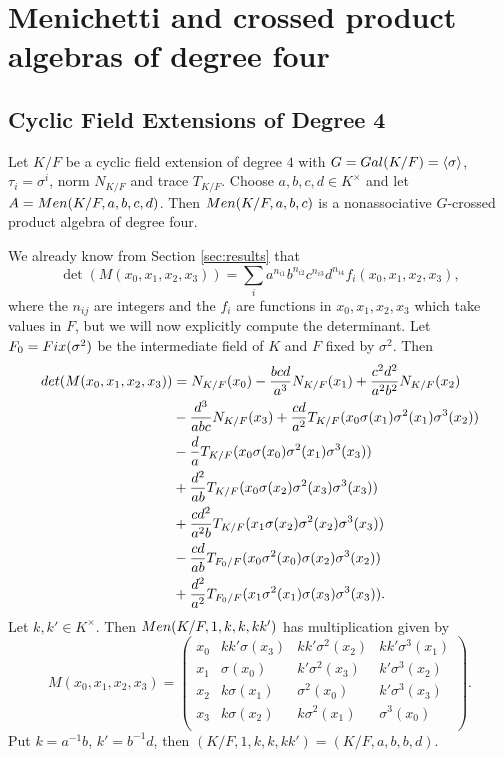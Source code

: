 \documentclass[11pt]{amsart}
\theoremstyle{plain}
\theoremstyle{definition}
\begin{document}
\section{Menichetti and crossed product  algebras of degree four} \label{sec:4}

\subsection{Cyclic Field Extensions of Degree 4} \label{degree 4 cyclic}

Let $K/F$ be a cyclic field extension  of degree $4$ with $G={\rm Gal}(K/F)=\langle\sigma\rangle$, $\tau_i=\sigma^i$, norm $N_{K/F}$ and trace $T_{K/F}$. Choose $a,b,c,d \in K^\times$ and let $A={\rm Men}(K/F, a,b,c,d)$.
Then  ${\rm Men}(K/F, a,b,c) $ is a nonassociative $G$-crossed product algebra of degree four.

We already know from Section \ref{sec:results} that
$$\det (M(x_0, x_1, x_2, x_3))=\sum_i a^{n_{i1}}b^{n_{i2}}c^{n_{i3}}d^{n_{i4}} f_i(x_0, x_1, x_2, x_3),$$
where the $n_{ij}$ are integers and the $f_i$ are functions in $x_0, x_1, x_2, x_3$ which take values in $F$,
but we will now explicitly compute the determinant.
Let  $F_0={\rm Fix}(\sigma^2)$ be the intermediate field of $K$ and $F$ fixed by $\sigma^2$. Then
\begin{align} \label{ExplicitDet}
{\rm det}(M(x_0, x_1, x_2, x_3)) & = N_{K/F}(x_0) - \frac{bcd}{a^3}N_{K/F}(x_1) + \frac{c^2d^2}{a^2b^2}N_{K/F}(x_2) \notag \\
& - \frac{d^3}{abc}N_{K/F}(x_3) + \frac{cd}{a^2}T_{K/F}(x_0 \sigma(x_1)\sigma^2(x_1) \sigma^3(x_2)) \notag \\
& - \frac{d}{a}T_{K/F}(x_0 \sigma(x_0) \sigma^2(x_1) \sigma^3(x_3))\notag \\
& + \frac{d^2}{ab}T_{K/F}(x_0 \sigma(x_2)\sigma^2(x_3) \sigma^3(x_3)) \\
& + \frac{cd^2}{a^2b}T_{K/F}(x_1 \sigma(x_2) \sigma^2(x_2) \sigma^3(x_3)) \notag \\
& - \frac{cd}{ab}T_{F_0/F}(x_0\sigma^2(x_0) \sigma(x_2)  \sigma^3(x_2))\notag \\
& + \frac{d^2}{a^2}T_{F_0/F}(x_1\sigma^2(x_1)\sigma(x_3)\sigma^3(x_3)) \notag.
\end{align}
Let $k,k'\in K^\times$. Then ${\rm Men}(K/F,1,k,k,kk')$ has multiplication given by
\[ M(x_0, x_1, x_2, x_3)=
\left( \begin{array}{cccc}
x_0 &  kk'\sigma(x_{3}) & kk'\sigma^2(x_{2}) & kk' \sigma^{3}(x_{1})\\
x_1 & \sigma(x_0)       & k' \sigma^2(x_{3})  &  k' \sigma^{3}(x_{2})\\
x_2 & k\sigma(x_{1})    & \sigma^2(x_0)       & k' \sigma^{3}(x_{3})\\
x_3 &  k\sigma(x_{2})   &  k\sigma^2(x_1)      &  \sigma^{3}(x_{0}) \\
\end {array}\right) .
 \]
 Put $k=a^{-1}b$, $k'=b^{-1}d$, then $(K/F,1,k,k,kk')=(K/F,a,b,b,d)$.
\end{document}

